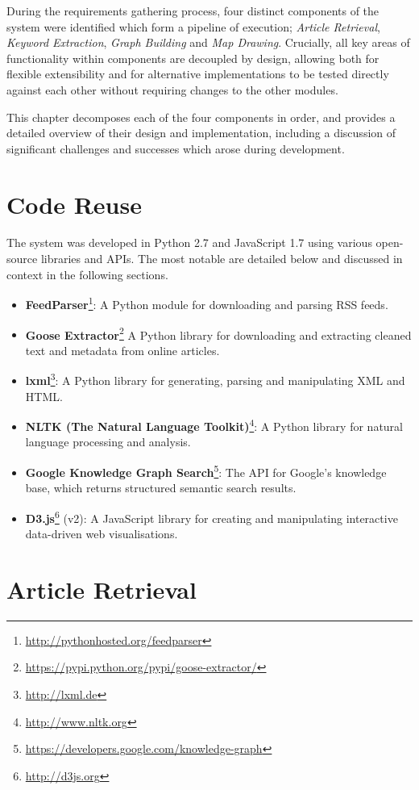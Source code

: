During the requirements gathering process, four distinct components of the system were identified which form a pipeline of execution; \textit{Article Retrieval}, \textit{Keyword Extraction}, \textit{Graph Building} and \textit{Map Drawing}. Crucially, all key areas of functionality within components are decoupled by design, allowing both for flexible extensibility and for alternative implementations to be tested directly against each other without requiring changes to the other modules.

This chapter decomposes each of the four components in order, and provides a detailed overview of their design and implementation, including a discussion of significant challenges and successes which arose during development.

\section{Code Reuse}
The system was developed in Python 2.7 and JavaScript 1.7 using various open-source libraries and APIs. The most notable are detailed below and discussed in context in the following sections.
\begin{itemize}[itemsep=0.1em]
	\item\textbf{FeedParser}\footnote{\url{http://pythonhosted.org/feedparser}}: A Python module for downloading and parsing RSS feeds.
	\item\textbf{Goose Extractor}\footnote{\url{https://pypi.python.org/pypi/goose-extractor/}} A Python library for downloading and extracting cleaned text and metadata from online articles. 
	\item\textbf{lxml}\footnote{\url{http://lxml.de}}: A Python library for generating, parsing and manipulating XML and HTML.
	\item\textbf{NLTK (The Natural Language Toolkit)}\footnote{\url{http://www.nltk.org}}: A Python library for natural language processing and analysis.
	\item\textbf{Google Knowledge Graph Search}\footnote{\url{https://developers.google.com/knowledge-graph}}: The API for Google's knowledge base, which returns structured semantic search results.
	\item\textbf{D3.js}\footnote{\url{http://d3js.org}} (v2): A JavaScript library for creating and manipulating interactive data-driven web visualisations.
\end{itemize}

\section{Article Retrieval}

